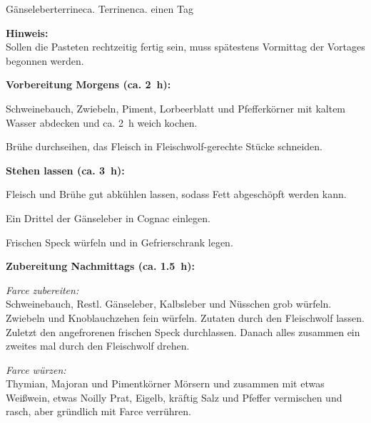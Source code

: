 \begin{MyRecipe}{Gänseleberterrine}{ca.  Terrinen}{ca. einen Tag}

\textbf{Hinweis:}\\
Sollen die Pasteten rechtzeitig fertig sein, muss spätestens Vormittag der Vortages begonnen werden.\par\bigskip

\textbf{Vorbereitung Morgens (ca. 2~h):}


Schweinebauch, Zwiebeln, Piment, Lorbeerblatt und Pfefferkörner mit kaltem Wasser abdecken und ca. \SI{2}{\hour} weich kochen.\par
Brühe durchseihen, das Fleisch in Fleischwolf-gerechte Stücke schneiden.\par\bigskip

\textbf{Stehen lassen (ca. 3~h):}

Fleisch und Brühe gut abkühlen lassen, sodass Fett abgeschöpft werden kann.\par
Ein Drittel der Gänseleber in Cognac einlegen.\par
Frischen Speck würfeln und in Gefrierschrank legen.\par\bigskip

\textbf{Zubereitung Nachmittags (ca. 1.5~h):}

\textit{Farce zubereiten:}\\	
Schweinebauch, Restl. Gänseleber, Kalbsleber und Nüsschen grob würfeln. Zwiebeln und Knoblauchzehen fein würfeln. Zutaten durch den Fleischwolf lassen. Zuletzt den angefrorenen frischen Speck durchlassen. Danach alles zusammen ein zweites mal durch den Fleischwolf drehen.


\textit{Farce würzen:}\\	
Thymian, Majoran und Pimentkörner Mörsern und zusammen mit etwas Weißwein, etwas Noilly Prat, Eigelb, kräftig Salz und Pfeffer vermischen und rasch, aber gründlich mit Farce verrühren.




\end{MyRecipe}
